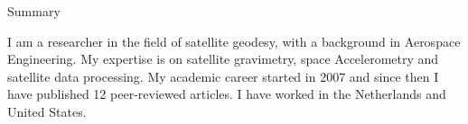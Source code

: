 
\begin{cvtext}{Summary}






I am a researcher in the field of satellite geodesy, with a background in Aerospace Engineering. My expertise is on satellite gravimetry, space Accelerometry and satellite data processing. My academic career started in 2007 and since then I have published 12 peer-reviewed articles. I have worked in the Netherlands and United States.


\end{cvtext}
